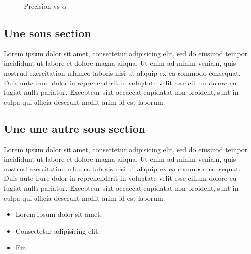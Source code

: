 \begin{figure} [ht]
 	\caption{Precision vs $\alpha$} 
 	\label{Results}
 \end{figure}
\subsection{Une sous section}
Lorem ipsum dolor sit amet, consectetur adipisicing elit, sed do eiusmod
tempor incididunt ut labore et dolore magna aliqua. Ut enim ad minim veniam,
quis nostrud exercitation ullamco laboris nisi ut aliquip ex ea commodo
consequat. Duis aute irure dolor in reprehenderit in voluptate velit esse
cillum dolore eu fugiat nulla pariatur. Excepteur sint occaecat cupidatat non
proident, sunt in culpa qui officia deserunt mollit anim id est laborum.

\subsection{Une une autre sous section}
Lorem ipsum dolor sit amet, consectetur adipisicing elit, sed do eiusmod
tempor incididunt ut labore et dolore magna aliqua. Ut enim ad minim veniam,
quis nostrud exercitation ullamco laboris nisi ut aliquip ex ea commodo
consequat. Duis aute irure dolor in reprehenderit in voluptate velit esse
cillum dolore eu fugiat nulla pariatur. Excepteur sint occaecat cupidatat non
proident, sunt in culpa qui officia deserunt mollit anim id est laborum.

\begin{itemize}
	\item Lorem ipsum dolor sit amet;
	\item Consectetur adipisicing elit;
	\item Fin.
\end{itemize}

